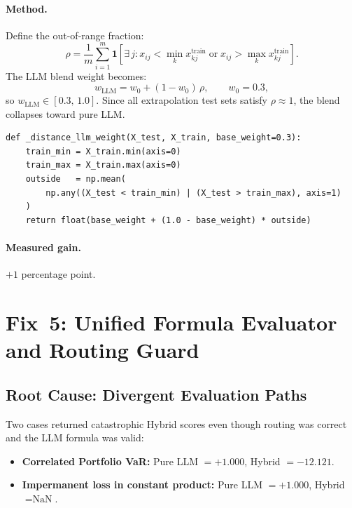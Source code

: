 \documentclass[twoside,11pt]{article}
\begin{document}
\paragraph{Method.}
Define the out-of-range fraction:
\[
  \rho = \frac{1}{m}\sum_{i=1}^{m}
         \mathbf{1}\!\left[
           \exists\,j : x_{ij} < \min_k x_{kj}^{\text{train}}
                       \;\text{or}\;
                       x_{ij} > \max_k x_{kj}^{\text{train}}
         \right].
\]
The LLM blend weight becomes:
\[
  w_{\text{LLM}} = w_0 + (1-w_0)\,\rho, \qquad w_0 = 0.3,
\]
so $w_{\text{LLM}} \in [0.3,\,1.0]$.  Since all extrapolation test sets satisfy
$\rho \approx 1$, the blend collapses toward pure LLM.

\begin{lstlisting}[caption={Distance-gated blend weight.}]
def _distance_llm_weight(X_test, X_train, base_weight=0.3):
    train_min = X_train.min(axis=0)
    train_max = X_train.max(axis=0)
    outside   = np.mean(
        np.any((X_test < train_min) | (X_test > train_max), axis=1)
    )
    return float(base_weight + (1.0 - base_weight) * outside)
\end{lstlisting}

\paragraph{Measured gain.} $+1$ percentage point.

\section{Fix~5: Unified Formula Evaluator and Routing Guard}
\label{sec:fix5}

\subsection{Root Cause: Divergent Evaluation Paths}

Two cases returned catastrophic Hybrid scores even though routing was correct
and the LLM formula was valid:

\begin{itemize}[leftmargin=*]
  \item \textbf{Correlated Portfolio VaR:} Pure LLM $= +1.000$,
    Hybrid $= -12.121$.
  \item \textbf{Impermanent loss in constant product:} Pure LLM $= +1.000$,
    Hybrid $= \text{NaN}$.
\end{itemize}
\end{document}
